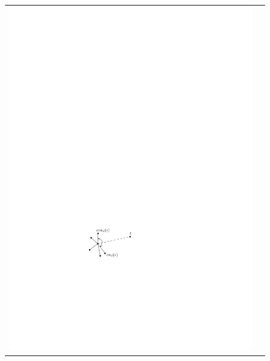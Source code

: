 \documentclass{elsarticle}
\begin{document}
\begin{figure}
  \begin{center}
    \begin{tabular}{cc}
    \includegraphics{pics/random-compass} &

\end{tabular}
\end{center}
\end{figure}
\end{document}
